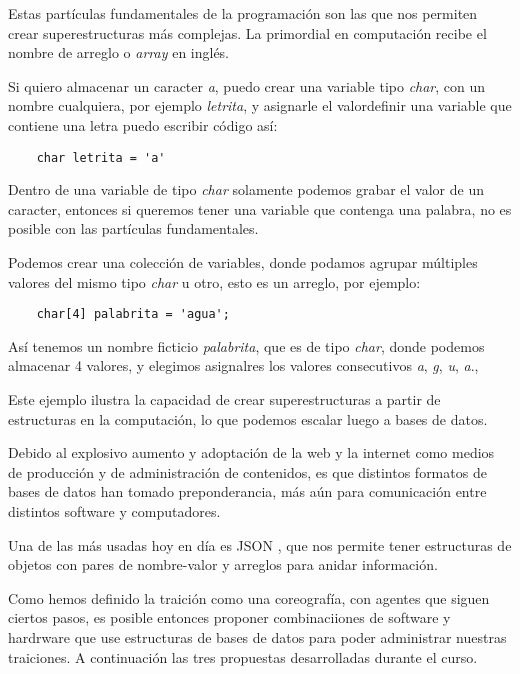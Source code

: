 \documentclass{article}
\begin{document}
Estas partículas fundamentales de la programación son las que nos permiten crear superestructuras más complejas. La primordial en computación recibe el nombre de arreglo o \textit{array} en inglés.

Si quiero almacenar un caracter \textit{a}, puedo crear una variable tipo \textit{char}, con un nombre cualquiera, por ejemplo \textit{letrita}, y asignarle el valordefinir  una variable que contiene una letra puedo escribir código así:

\begin{lstlisting}
    char letrita = 'a'
\end{lstlisting}

Dentro de una variable de tipo \textit{char} solamente podemos grabar el valor de un caracter, entonces si queremos tener una variable que contenga una palabra, no es posible con las partículas fundamentales.

Podemos crear una colección de variables, donde podamos agrupar múltiples valores del mismo tipo \textit{char} u otro, esto es un arreglo, por ejemplo:

\begin{lstlisting}
    char[4] palabrita = 'agua';
\end{lstlisting}

Así tenemos un nombre ficticio \textit{palabrita}, que es de tipo \textit{char}, donde podemos almacenar 4 valores, y elegimos asignalres los valores consecutivos \textit{a}, \textit{g}, \textit{u}, \textit{a}.,

Este ejemplo ilustra la capacidad de crear superestructuras a partir de estructuras en la computación, lo que podemos escalar luego a bases de datos.

Debido al explosivo aumento y adoptación de la web y la internet como medios de producción y de administración de contenidos, es que distintos formatos de bases de datos han tomado preponderancia, más aún para comunicación entre distintos software y computadores.

Una de las más usadas hoy en día es JSON \cite{json}, que nos permite tener estructuras de objetos con pares de nombre-valor y arreglos para anidar información.

Como hemos definido la traición como una coreografía, con agentes que siguen ciertos pasos, es posible entonces proponer combinaciiones de software y hardrware que use estructuras de bases de datos para poder administrar nuestras traiciones. A continuación las tres propuestas desarrolladas durante el curso.
\end{document}
